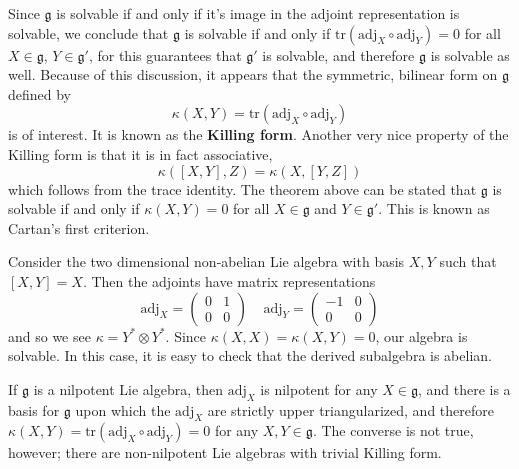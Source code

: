 Since $\mathfrak{g}$ is solvable if and only if it's image in the adjoint representation is solvable, we conclude that $\mathfrak{g}$ is solvable if and only if $\text{tr}(\text{adj}_X \circ \text{adj}_Y) = 0$ for all $X \in \mathfrak{g}$, $Y \in \mathfrak{g}'$, for this guarantees that $\mathfrak{g}'$ is solvable, and therefore $\mathfrak{g}$ is solvable as well. Because of this discussion, it appears that the symmetric, bilinear form on $\mathfrak{g}$ defined by
%
\[ \kappa(X,Y) = \text{tr}(\text{adj}_X \circ \text{adj}_Y) \]
%
is of interest. It is known as the {\bf Killing form}. Another very nice property of the Killing form is that it is in fact associative,
%
\[ \kappa([X,Y],Z) = \kappa(X,[Y,Z]) \]
%
which follows from the trace identity. The theorem above can be stated that $\mathfrak{g}$ is solvable if and only if $\kappa(X,Y) = 0$ for all $X \in \mathfrak{g}$ and $Y \in \mathfrak{g}'$. This is known as Cartan's first criterion.

\begin{example}
    Consider the two dimensional non-abelian Lie algebra with basis $X,Y$ such that $[X,Y] = X$. Then the adjoints have matrix representations
    \[ \text{adj}_X = \begin{pmatrix} 0 & 1 \\ 0 & 0 \end{pmatrix}\ \ \ \ \ \text{adj}_Y = \begin{pmatrix} -1 & 0 \\ 0 & 0 \end{pmatrix} \]
    and so we see $\kappa = Y^* \otimes Y^*$. Since $\kappa(X,X) = \kappa(X,Y) = 0$, our algebra is solvable. In this case, it is easy to check that the derived subalgebra is abelian.
\end{example}

\begin{example}
    If $\mathfrak{g}$ is a nilpotent Lie algebra, then $\text{adj}_X$ is nilpotent for any $X \in \mathfrak{g}$, and there is a basis for $\mathfrak{g}$ upon which the $\text{adj}_X$ are strictly upper triangularized, and therefore $\kappa(X,Y) = \text{tr}(\text{adj}_X \circ \text{adj}_Y) = 0$ for any $X,Y \in \mathfrak{g}$. The converse is not true, however; there are non-nilpotent Lie algebras with trivial Killing form.
\end{example}

